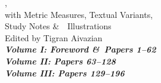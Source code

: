 \begin{center}
{{,\\
with Metric Measures, Textual Variants,\\
Study Notes \&\ \totalfigures\ Illustrations\\[2ex]
}
Edited by Tigran Aivazian\\[2ex]
}%
\ifmultivol
\LARGE\bfseries\itshape
\ifvoli Volume I: Foreword \&\ Papers 1--62\\\fi
\ifvolii Volume II: Papers 63--128\\\fi
\ifvoliii Volume III: Papers 129--196\\\fi
\fi
{}
\titlesepbig\\
\end{center}


\newpage


